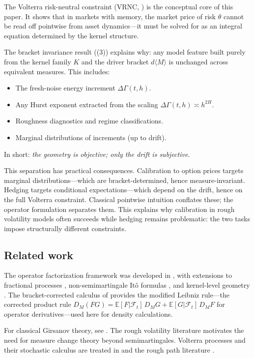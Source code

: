\documentclass[11pt]{article}
\theoremstyle{plain}
\theoremstyle{definition}
\theoremstyle{remark}
\newcommand{\E}{\mathbb{E}}
\newcommand{\F}{\mathcal{F}}
\newcommand{\dGamma}{\Delta\Gamma}
\newcommand{\bracket}[1]{\langle #1 \rangle}
\begin{document}
The Volterra risk-neutral constraint (VRNC, ) is the
conceptual core of this paper. It shows that in markets with memory, the market
price of risk $\theta$ cannot be read off pointwise from asset dynamics---it must
be solved for as an integral equation determined by the kernel structure.

The bracket invariance result ((3)) explains why:
any model feature built purely from the kernel family $K$ and the driver
bracket $d\bracket{M}$ is unchanged across equivalent measures. This includes:

\begin{itemize}
\item The fresh-noise energy increment $\dGamma(t,h)$.
\item Any Hurst exponent extracted from the scaling $\dGamma(t,h) \asymp h^{2H}$.
\item Roughness diagnostics and regime classifications.
\item Marginal distributions of increments (up to drift).
\end{itemize}

In short: \emph{the geometry is objective; only the drift is subjective}.

This separation has practical consequences. Calibration to option prices
targets marginal distributions---which are bracket-determined, hence
measure-invariant. Hedging targets conditional expectations---which depend
on the drift, hence on the full Volterra constraint. Classical pointwise
intuition conflates these; the operator formulation separates them. This
explains why calibration in rough volatility models often succeeds while
hedging remains problematic: the two tasks impose structurally different
constraints.

\subsection{Related work}

The operator factorization framework was developed in \cite{Fontes2026a},
with extensions to fractional processes \cite{Fontes2026b}, non-semimartingale
It\^o formulas \cite{Fontes2026c}, and kernel-level geometry \cite{Fontes2026f}.
The bracket-corrected calculus of \cite{Fontes2026g} provides the modified
Leibniz rule---the corrected product rule $D_M(FG) = \E[F|\F_t]\,D_M G + \E[G|\F_t]\,D_M F$
for operator derivatives---used here for density calculations.

For classical Girsanov theory, see \cite{KaratzasShreve1991}. The rough
volatility literature \cite{GatheralJaissonRosenbaum2018} motivates the
need for measure change theory beyond semimartingales. Volterra processes
and their stochastic calculus are treated in \cite{Decreusefond1999} and
the rough path literature \cite{FrizHairer2014}.
\end{document}
